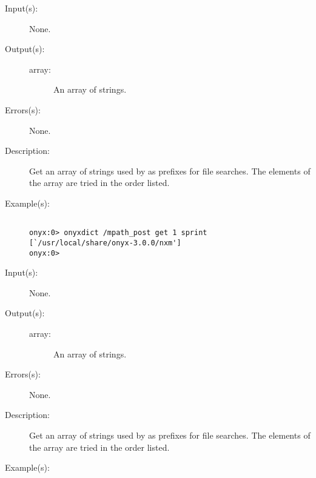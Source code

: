 \begin{description}
\label{onyxdict:mpath_post}
\item[{\onyxop{--}{mpath\_post}{array}}: ]
	\begin{description}\item[]
	\item[Input(s): ] None.
	\item[Output(s): ]
		\begin{description}\item[]
		\item[array: ]
			An array of strings.
		\end{description}
	\item[Errors(s): ] None.
	\item[Description: ]
		Get an array of strings used by
		 as prefixes for file
		searches.  The elements of the array are tried in the order
		listed.
	\item[Example(s): ]\begin{verbatim}

onyx:0> onyxdict /mpath_post get 1 sprint
[`/usr/local/share/onyx-3.0.0/nxm']
onyx:0>
		\end{verbatim}
	\end{description}
\label{onyxdict:mpath_pre}
\item[{\onyxop{--}{mpath\_pre}{array}}: ]
	\begin{description}\item[]
	\item[Input(s): ] None.
	\item[Output(s): ]
		\begin{description}\item[]
		\item[array: ]
			An array of strings.
		\end{description}
	\item[Errors(s): ] None.
	\item[Description: ]
		Get an array of strings used by
		 as prefixes for file
		searches.  The elements of the array are tried in the order
		listed.
	\item[Example(s): ]\begin{verbatim}


\end{verbatim}
\end{description}
\end{description}
